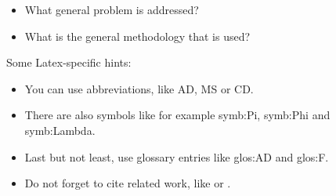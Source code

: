 \begin{itemize}
\item What general problem is addressed?
\item What is the general methodology that is used?
\end{itemize}

Some Latex-specific hints:


\begin{itemize}
\item You can use abbreviations, like \gls{AD}, \gls{MS} or \gls{CD}.
\item There are also symbols like for example \gls{symb:Pi}, \gls{symb:Phi} and \gls{symb:Lambda}.
\item Last but not least, use glossary entries like \gls{glos:AD} and \gls{glos:F}.
\item Do not forget to cite related work, like \cite{okman2011security} or \cite{borthakur2011apache}.
\end{itemize}